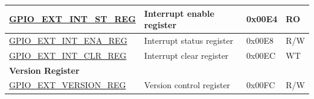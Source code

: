 \begin{longtable}{ | p{6.2cm} | p{7.2cm} | p{1.3cm} | p{1cm} | }
\hyperref[regdesc:GPIOSDINTSTREG]{GPIO\_EXT\_INT\_ST\_REG} &  Interrupt enable register & 0x00E4 & RO \\ \hline

\hyperref[regdesc:GPIOSDINTENAREG]{GPIO\_EXT\_INT\_ENA\_REG} &  Interrupt status register & 0x00E8 & R/W \\ \hline

\hyperref[regdesc:GPIOSDINTCLRREG]{GPIO\_EXT\_INT\_CLR\_REG} &  Interrupt clear register & 0x00EC & WT \\ \hline

\multicolumn{4}{|l|}{\textbf{Version Register}} \\ \hline

\hyperref[regdesc:GPIOSDVERSIONREG]{GPIO\_EXT\_VERSION\_REG} & Version control register & 0x00FC & R/W \\ \hline

\end{longtable}



